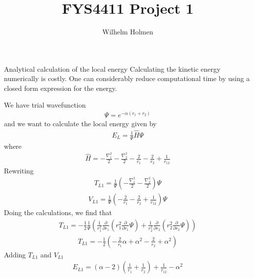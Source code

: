 \documentclass[a4paper, 12pt, titlepage]{article}
\author{Wilhelm Holmen}
\title{FYS4411 Project 1}
\begin{document}
 \maketitle
 \newpage

 \begin{section}{Analytical calculation of the local energy}
 Calculating the kinetic energy numerically is costly. One can considerably reduce computational time by using a closed form expression for the energy. 

 We have trial wavefunction 
 \begin{align*}
 	\Psi = e^{-\alpha(r_1 + r_2)}
 \end{align*}
 and we want to calculate the local energy given by
 \begin{align*}
 	E_L = \frac{1}{\Psi} \hat H \Psi
 \end{align*}
 where
 \begin{align*}
 	\hat H = -\frac{\nabla_1^2}{2} - \frac{\nabla_2^2}{2} - \frac{2}{r_1} - \frac{2}{r_2} + \frac{1}{r_{12}}
 \end{align*}
 Rewriting	
 \begin{align*}
 	T_{L1} = \frac{1}{\Psi} \left( -\frac{\nabla_1^2}{2} - \frac{\nabla_2^2}{2} \right) \Psi
 \end{align*}
 \begin{align*}
 	V_{L1} = \frac{1}{\Psi} \left( - \frac{2}{r_1} - \frac{2}{r_2} + \frac{1}{r_{12}} \right) \Psi
 \end{align*}
 Doing the calculations, we find that
 \begin{align*}
 	T_{L1} = -\frac{1}{2} \frac{1}{\Psi} \left( \frac{1}{r_1^2} \frac{\partial}{\partial r_1} \left( r_1^2 \frac{\partial}{\partial r_1} \Psi \right) + \frac{1}{r_2^2} \frac{\partial}{\partial r_2} \left( r_2^2 \frac{\partial}{\partial r_2} \Psi \right) \right)
 \end{align*}
 \begin{align*}
 	T_{L1} = -\frac{1}{2} \left( -\frac{2}{r_1}\alpha + \alpha^2 - \frac{2}{r_2} + \alpha^2 \right)
 \end{align*}
 Adding $T_{L1}$ and $V_{L1}$ 
 \begin{align*}
 	E_{L1} = \left( \alpha - 2 \right) \left( \frac{1}{r_1} + \frac{1}{r_2} \right) + \frac{1}{r_{12}} - \alpha^2 
 \end{align*}


\end{section}
\end{document}
